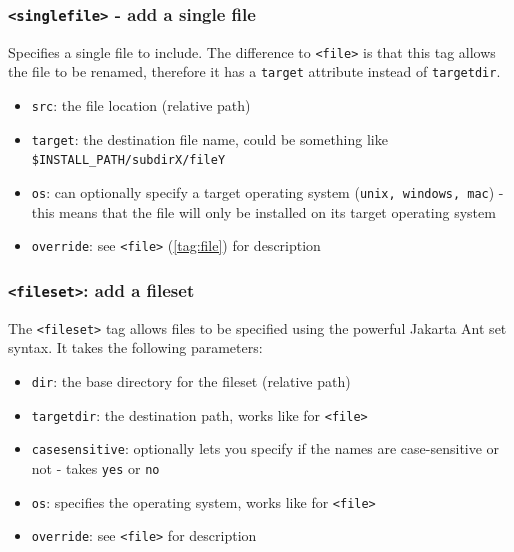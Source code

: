 \subsubsection{\label{tag:singlefile}\texttt{<singlefile>} - add a single file}

Specifies a single file to include. The difference to \texttt{<file>} is that
this tag allows the file to be renamed, therefore it has a 
\texttt{target} attribute instead of \texttt{targetdir}.

\begin{itemize}

  \item \texttt{src}: the file location (relative path)

  \item \texttt{target}: the destination file name, could be something
  like \texttt{\$INSTALL\_PATH/subdirX/fileY}

  \item \texttt{os}: can optionally specify a target operating system
  (\texttt{unix, windows, mac}) - this means that the file will only be
  installed on its target operating system

  \item \texttt{override}: see \texttt{<file>} (\ref{tag:file}) for description

\end{itemize}

\subsubsection{\label{tag:fileset}\texttt{<fileset>}: add a fileset}

The \texttt{<fileset>} tag allows files to be specified using the powerful
Jakarta Ant set syntax. It takes the following parameters:

\begin{itemize}

  \item \texttt{dir}: the base directory for the fileset (relative path)

  \item \texttt{targetdir}: the destination path, works like for
  \texttt{<file>}

  \item \texttt{casesensitive}: optionally lets you specify if the names
  are case-sensitive or not - takes \texttt{yes} or \texttt{no}

  \item \texttt{os}: specifies the operating system, works like for
  \texttt{<file>}

  \item \texttt{override}: see \texttt{<file>} for description

\end{itemize}

